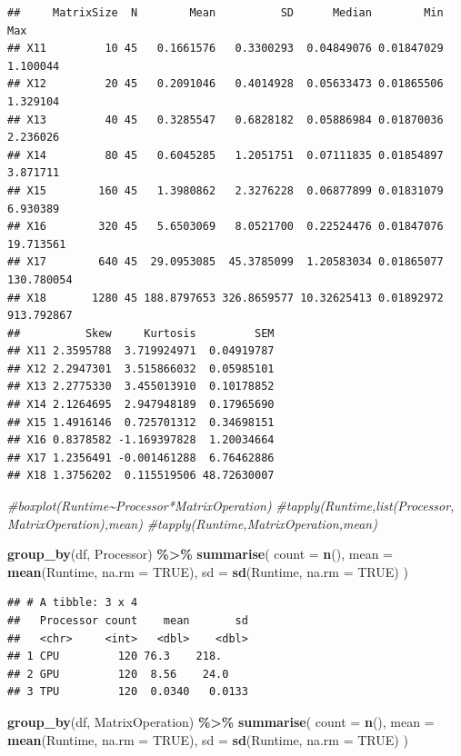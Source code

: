 \documentclass[
]{article}
\newenvironment{Shaded}{\begin{snugshade}}{\end{snugshade}}
\newcommand{\CommentTok}[1]{\textcolor[rgb]{0.56,0.35,0.01}{\textit{#1}}}
\newcommand{\DataTypeTok}[1]{\textcolor[rgb]{0.13,0.29,0.53}{#1}}
\newcommand{\KeywordTok}[1]{\textcolor[rgb]{0.13,0.29,0.53}{\textbf{#1}}}
\newcommand{\NormalTok}[1]{#1}
\newcommand{\OperatorTok}[1]{\textcolor[rgb]{0.81,0.36,0.00}{\textbf{#1}}}
\newcommand{\OtherTok}[1]{\textcolor[rgb]{0.56,0.35,0.01}{#1}}
\newcommand{\StringTok}[1]{\textcolor[rgb]{0.31,0.60,0.02}{#1}}
\begin{document}
\begin{verbatim}
##     MatrixSize  N        Mean          SD      Median        Min        Max
## X11         10 45   0.1661576   0.3300293  0.04849076 0.01847029   1.100044
## X12         20 45   0.2091046   0.4014928  0.05633473 0.01865506   1.329104
## X13         40 45   0.3285547   0.6828182  0.05886984 0.01870036   2.236026
## X14         80 45   0.6045285   1.2051751  0.07111835 0.01854897   3.871711
## X15        160 45   1.3980862   2.3276228  0.06877899 0.01831079   6.930389
## X16        320 45   5.6503069   8.0521700  0.22524476 0.01847076  19.713561
## X17        640 45  29.0953085  45.3785099  1.20583034 0.01865077 130.780054
## X18       1280 45 188.8797653 326.8659577 10.32625413 0.01892972 913.792867
##          Skew     Kurtosis         SEM
## X11 2.3595788  3.719924971  0.04919787
## X12 2.2947301  3.515866032  0.05985101
## X13 2.2775330  3.455013910  0.10178852
## X14 2.1264695  2.947948189  0.17965690
## X15 1.4916146  0.725701312  0.34698151
## X16 0.8378582 -1.169397828  1.20034664
## X17 1.2356491 -0.001461288  6.76462886
## X18 1.3756202  0.115519506 48.72630007
\end{verbatim}

\begin{Shaded}
\begin{Highlighting}[]
\CommentTok{\#boxplot(Runtime\textasciitilde{}Processor*MatrixOperation)}
\CommentTok{\#tapply(Runtime,list(Processor, MatrixOperation),mean)}
\CommentTok{\#tapply(Runtime,MatrixOperation,mean)}

\KeywordTok{group\_by}\NormalTok{(df, Processor) }\OperatorTok{\%\textgreater{}\%}
\StringTok{  }\KeywordTok{summarise}\NormalTok{(}
    \DataTypeTok{count =} \KeywordTok{n}\NormalTok{(),}
    \DataTypeTok{mean =} \KeywordTok{mean}\NormalTok{(Runtime, }\DataTypeTok{na.rm =} \OtherTok{TRUE}\NormalTok{),}
    \DataTypeTok{sd =} \KeywordTok{sd}\NormalTok{(Runtime, }\DataTypeTok{na.rm =} \OtherTok{TRUE}\NormalTok{)}
\NormalTok{  )}
\end{Highlighting}
\end{Shaded}

\begin{verbatim}
## # A tibble: 3 x 4
##   Processor count    mean       sd
##   <chr>     <int>   <dbl>    <dbl>
## 1 CPU         120 76.3    218.    
## 2 GPU         120  8.56    24.0   
## 3 TPU         120  0.0340   0.0133
\end{verbatim}

\begin{Shaded}
\begin{Highlighting}[]
\KeywordTok{group\_by}\NormalTok{(df, MatrixOperation) }\OperatorTok{\%\textgreater{}\%}
\StringTok{  }\KeywordTok{summarise}\NormalTok{(}
    \DataTypeTok{count =} \KeywordTok{n}\NormalTok{(),}
    \DataTypeTok{mean =} \KeywordTok{mean}\NormalTok{(Runtime, }\DataTypeTok{na.rm =} \OtherTok{TRUE}\NormalTok{),}
    \DataTypeTok{sd =} \KeywordTok{sd}\NormalTok{(Runtime, }\DataTypeTok{na.rm =} \OtherTok{TRUE}\NormalTok{)}
\NormalTok{  )}
\end{Highlighting}
\end{Shaded}
\end{document}
